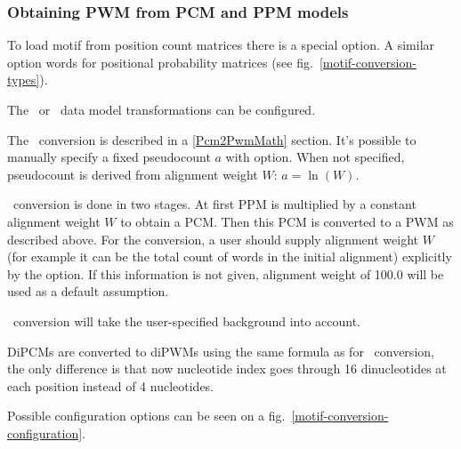 \subsubsection{Obtaining PWM from PCM and PPM models}
To load motif from position count matrices there is a special  option.
A similar option  words for positional probability matrices (see fig.~\ref{motif-conversion-types}).

The \PcmToPwm\ or \PpmToPwm\ data model transformations can be configured.

The \PcmToPwm\ conversion is described in a \ref{Pcm2PwmMath} section. It's possible to manually specify a fixed pseudocount $a$ with  option. When not specified, pseudocount is derived from alignment weight $W$: $a =\ln(W)$.

\PpmToPwm\ conversion is done in two stages. At first PPM is multiplied by a constant alignment weight $W$ to obtain a PCM. Then this PCM is converted to a PWM as described above.
For the \PpmToPwm conversion, a user should supply alignment weight $W$ (for example it can be the total count of words in the initial alignment) explicitly by the  option. If this information is not given, alignment weight of 100.0 will be used as a default assumption.

\PcmToPwm\ conversion will take the user-specified background into account.

DiPCMs are converted to diPWMs using the same formula as for \PcmToPwm\ conversion, the only difference is that now nucleotide index goes through 16 dinucleotides at each position instead of 4 nucleotides.

Possible configuration options can be seen on a fig.~\ref{motif-conversion-configuration}.
